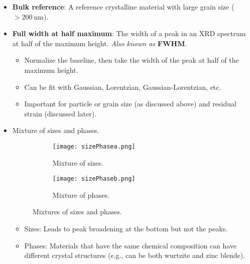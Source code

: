 \documentclass[../notes.tex]{subfiles}
\begin{document}
\begin{itemize}
\begin{itemize}
        where $B_m$ is the measured FWHM and $B_\text{ref}$ is the corresponding FWHM of the \textbf{bulk reference}.
        \item Readily applicable for crystal size of \SIrange{2}{100}{\nano\meter}.
        \begin{itemize}
            \item Applicable up to \SI{500}{\nano\meter} if a synchrotron light source is used.
        \end{itemize}
    \end{itemize}
    \item \textbf{Bulk reference}: A reference crystalline material with large grain size ($>\SI{200}{\nano\meter}$).
    \item \textbf{Full width at half maximum}: The width of a peak in an XRD spectrum at half of the maximum height. \emph{Also known as} \textbf{FWHM}.
    \begin{itemize}
        \item Normalize the baseline, then take the width of the peak at half of the maximum height.
        \item Can be fit with Gaussian, Lorentzian, Gaussian-Lorentzian, etc.
        \item Important for particle or grain size (as discussed above) and residual strain (discussed later).
    \end{itemize}
    \item Mixture of sizes and phases.
    \begin{figure}[h!]
        \centering
        \begin{subfigure}[b]{0.45\linewidth}
            \centering
            \texttt{[image: sizePhasea.png]}
            \caption{Mixture of sizes.}
            \label{fig:sizePhasea}
        \end{subfigure}
        \begin{subfigure}[b]{0.45\linewidth}
            \centering
            \texttt{[image: sizePhaseb.png]}
            \caption{Mixture of phases.}
            \label{fig:sizePhaseb}
        \end{subfigure}
        \caption{Mixtures of sizes and phases.}
        \label{fig:sizePhase}
    \end{figure}
    \begin{itemize}
        \item Sizes: Leads to peak broadening at the bottom but not the peaks.
        \item Phases: Materials that have the same chemical composition can have different crystal structures (e.g.,  can be both wurtzite and zinc blende).

\end{itemize}
\end{itemize}
\end{document}
